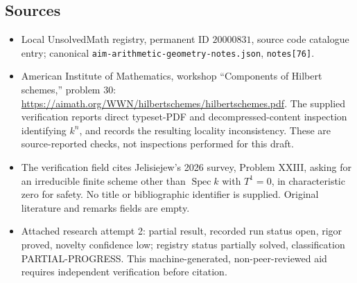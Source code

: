 \documentclass[11pt]{article}
\begin{document}
\subsection{Sources}
\begin{itemize}
\item Local UnsolvedMath registry, permanent ID $20000831$, source code catalogue entry; canonical \texttt{aim-arithmetic-geometry-notes.json}, \texttt{notes[76]}.
\item American Institute of Mathematics, workshop ``Components of Hilbert schemes,'' problem 30: \url{https://aimath.org/WWN/hilbertschemes/hilbertschemes.pdf}. The supplied verification reports direct typeset-PDF and decompressed-content inspection identifying $k^n$, and records the resulting locality inconsistency. These are source-reported checks, not inspections performed for this draft.
\item The verification field cites Jelisiejew's 2026 survey, Problem XXIII, asking for an irreducible finite scheme other than $\operatorname{Spec}k$ with $T^1=0$, in characteristic zero for safety. No title or bibliographic identifier is supplied. Original literature and remarks fields are empty.
\item Attached research attempt 2: partial result, recorded run status open, rigor proved, novelty confidence low; registry status partially solved, classification PARTIAL-PROGRESS. This machine-generated, non-peer-reviewed aid requires independent verification before citation.
\end{itemize}
\end{document}
